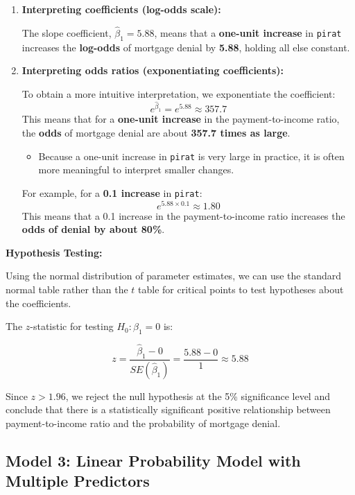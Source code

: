 \documentclass[
  12pt,
  a4paper,
]{scrbook}
\providecommand{\tightlist}{%
  \setlength{\itemsep}{0pt}\setlength{\parskip}{0pt}}
\renewcommand{\tightlist}{\setlength{\itemsep}{0.5\baselineskip}\setlength{\parskip}{0.2\baselineskip}}
\theoremstyle{plain}
\theoremstyle{definition}
\theoremstyle{remark}
\begin{document}
\begin{enumerate}
\def\labelenumi{\arabic{enumi}.}
\item
  \textbf{Interpreting coefficients (log-odds scale):}

  The slope coefficient, \(\hat{\beta}_1 = 5.88\), means that a
  \textbf{one-unit increase} in \texttt{pirat} increases the
  \textbf{log-odds} of mortgage denial by \textbf{5.88}, holding all
  else constant.
\item
  \textbf{Interpreting odds ratios (exponentiating coefficients):}

  To obtain a more intuitive interpretation, we exponentiate the
  coefficient: \[
  e^{\hat{\beta}_1} = e^{5.88} \approx 357.7
  \] This means that for a \textbf{one-unit increase} in the
  payment-to-income ratio, the \textbf{odds} of mortgage denial are
  about \textbf{357.7 times as large}.

  \begin{itemize}
  \tightlist
  \item
    Because a one-unit increase in \texttt{pirat} is very large in
    practice, it is often more meaningful to interpret smaller changes.
  \end{itemize}

  For example, for a \textbf{0.1 increase} in \texttt{pirat}: \[
  e^{5.88 \times 0.1} \approx 1.80
  \] This means that a 0.1 increase in the payment-to-income ratio
  increases the \textbf{odds of denial by about 80\%}.
\end{enumerate}

\textbf{Hypothesis Testing:}

Using the normal distribution of parameter estimates, we can use the
standard normal table rather than the \(t\) table for critical points to
test hypotheses about the coefficients.

The \(z\)-statistic for testing \(H_0: \beta_1 = 0\) is:

\[
z = \frac{\hat{\beta}_1 - 0}{SE(\hat{\beta}_1)} = \frac{5.88 - 0}{1} \approx 5.88
\]

Since \(z > 1.96\), we reject the null hypothesis at the 5\%
significance level and conclude that there is a statistically
significant positive relationship between payment-to-income ratio and
the probability of mortgage denial.

\subsection{Model 3: Linear Probability Model with Multiple
Predictors}\label{model-3-linear-probability-model-with-multiple-predictors}
\end{document}
